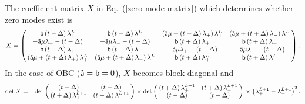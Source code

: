 \documentclass[aps, prb, showpacs, twocolumn, %
amssymb,superscriptaddress]{revtex4}
\begin{document}
The coefficient matrix $X$ in Eq.~(\ref{zero mode matrix}) which determines whether zero modes exist is
\onecolumngrid
\begin{equation}
X = \left( \begin{array}{@{\,}cccc@{\,}}
{\sf b} \left( t- \Delta \right) \lambda_{+}^{L}
& {\sf b} \left( t- \Delta \right) \lambda_{-}^{L}
& \left( \tilde{\sf a} \mu + \left( t + \Delta \right) \lambda_{+} \right) \lambda_{+}^{L}
& \left( \tilde{\sf a} \mu + \left( t + \Delta \right) \lambda_{-} \right) \lambda_{-}^{L} \\
- \tilde{\sf a} \mu \lambda_{+} - \left( t - \Delta \right)
& - \tilde{\sf a} \mu \lambda_{-} - \left( t - \Delta \right)
& {\sf b} \left( t+ \Delta \right) \lambda_{+}
& {\sf b} \left( t+ \Delta \right) \lambda_{-} \\
{\sf b} \left( t - \Delta \right) \lambda_{+}
& {\sf b} \left( t - \Delta \right) \lambda_{-}
& - \tilde{\sf a} \mu \lambda_{+} - \left( t - \Delta \right)
& - \tilde{\sf a} \mu \lambda_{-} - \left( t - \Delta \right) \\
\left( \tilde{\sf a} \mu + \left( t + \Delta \right) \lambda_{+} \right) \lambda_{+}^{L}
& \left( \tilde{\sf a} \mu + \left( t + \Delta \right) \lambda_{-} \right) \lambda_{-}^{L}
& {\sf b} \left( t + \Delta \right) \lambda_{+}^{L}
& {\sf b} \left( t + \Delta \right) \lambda_{-}^{L} \\		
      	\end{array} \right).
\end{equation}
In the case of OBC ($\tilde{\sf a} = {\sf b} = 0$), $X$ becomes block diagonal and
\begin{eqnarray}
\det X
&=& \det \left( \begin{array}{@{\,}cc@{\,}}
 \left( t - \Delta \right)
& \left( t - \Delta \right) \\
\left( t + \Delta \right) \lambda_{+}^{L+1}
& \left( t + \Delta \right) \lambda_{-}^{L+1} \\
			\end{array} \right)
\times \det \left( \begin{array}{@{\,}cc@{\,}}
\left( t + \Delta \right) \lambda_{+}^{L+1}
& \left( t + \Delta \right) \lambda_{-}^{L+1} \\
\left( t - \Delta \right)
& \left( t - \Delta \right) \\
			\end{array} \right)
\propto \left( \lambda_{+}^{L+1} - \lambda_{-}^{L+1} \right)^{2}.
\end{eqnarray}
\twocolumngrid
\end{document}
